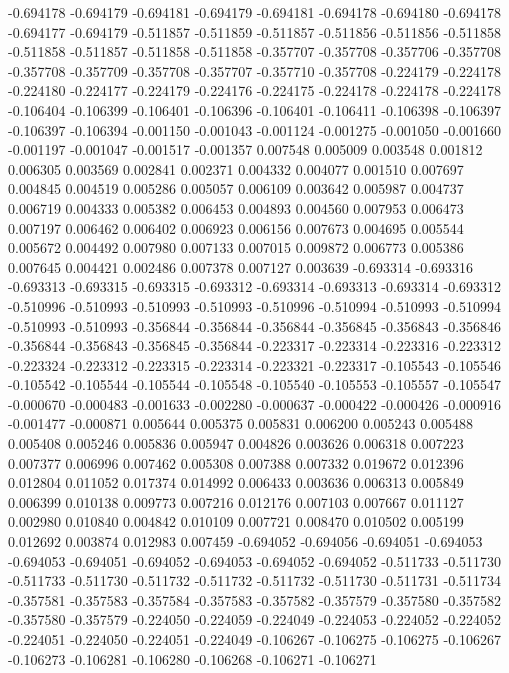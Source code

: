 -0.694178
-0.694179
-0.694181
-0.694179
-0.694181
-0.694178
-0.694180
-0.694178
-0.694177
-0.694179
-0.511857
-0.511859
-0.511857
-0.511856
-0.511856
-0.511858
-0.511858
-0.511857
-0.511858
-0.511858
-0.357707
-0.357708
-0.357706
-0.357708
-0.357708
-0.357709
-0.357708
-0.357707
-0.357710
-0.357708
-0.224179
-0.224178
-0.224180
-0.224177
-0.224179
-0.224176
-0.224175
-0.224178
-0.224178
-0.224178
-0.106404
-0.106399
-0.106401
-0.106396
-0.106401
-0.106411
-0.106398
-0.106397
-0.106397
-0.106394
-0.001150
-0.001043
-0.001124
-0.001275
-0.001050
-0.001660
-0.001197
-0.001047
-0.001517
-0.001357
0.007548
0.005009
0.003548
0.001812
0.006305
0.003569
0.002841
0.002371
0.004332
0.004077
0.001510
0.007697
0.004845
0.004519
0.005286
0.005057
0.006109
0.003642
0.005987
0.004737
0.006719
0.004333
0.005382
0.006453
0.004893
0.004560
0.007953
0.006473
0.007197
0.006462
0.006402
0.006923
0.006156
0.007673
0.004695
0.005544
0.005672
0.004492
0.007980
0.007133
0.007015
0.009872
0.006773
0.005386
0.007645
0.004421
0.002486
0.007378
0.007127
0.003639
-0.693314
-0.693316
-0.693313
-0.693315
-0.693315
-0.693312
-0.693314
-0.693313
-0.693314
-0.693312
-0.510996
-0.510993
-0.510993
-0.510993
-0.510996
-0.510994
-0.510993
-0.510994
-0.510993
-0.510993
-0.356844
-0.356844
-0.356844
-0.356845
-0.356843
-0.356846
-0.356844
-0.356843
-0.356845
-0.356844
-0.223317
-0.223314
-0.223316
-0.223312
-0.223324
-0.223312
-0.223315
-0.223314
-0.223321
-0.223317
-0.105543
-0.105546
-0.105542
-0.105544
-0.105544
-0.105548
-0.105540
-0.105553
-0.105557
-0.105547
-0.000670
-0.000483
-0.001633
-0.002280
-0.000637
-0.000422
-0.000426
-0.000916
-0.001477
-0.000871
0.005644
0.005375
0.005831
0.006200
0.005243
0.005488
0.005408
0.005246
0.005836
0.005947
0.004826
0.003626
0.006318
0.007223
0.007377
0.006996
0.007462
0.005308
0.007388
0.007332
0.019672
0.012396
0.012804
0.011052
0.017374
0.014992
0.006433
0.003636
0.006313
0.005849
0.006399
0.010138
0.009773
0.007216
0.012176
0.007103
0.007667
0.011127
0.002980
0.010840
0.004842
0.010109
0.007721
0.008470
0.010502
0.005199
0.012692
0.003874
0.012983
0.007459
-0.694052
-0.694056
-0.694051
-0.694053
-0.694053
-0.694051
-0.694052
-0.694053
-0.694052
-0.694052
-0.511733
-0.511730
-0.511733
-0.511730
-0.511732
-0.511732
-0.511732
-0.511730
-0.511731
-0.511734
-0.357581
-0.357583
-0.357584
-0.357583
-0.357582
-0.357579
-0.357580
-0.357582
-0.357580
-0.357579
-0.224050
-0.224059
-0.224049
-0.224053
-0.224052
-0.224052
-0.224051
-0.224050
-0.224051
-0.224049
-0.106267
-0.106275
-0.106275
-0.106267
-0.106273
-0.106281
-0.106280
-0.106268
-0.106271
-0.106271
